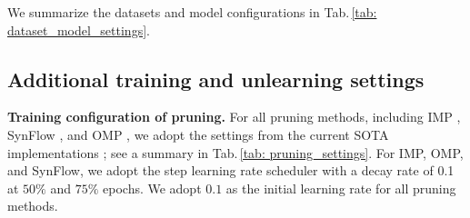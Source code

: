 We summarize the datasets and model configurations in Tab.\,\ref{tab: dataset_model_settings}.  %
\begin{table}[htb]
\centering
\caption{Dataset and model setups. }
\label{tab: dataset_model_settings}
\end{table}


\subsection{Additional training and unlearning settings}
\label{appendix: training and unlearning settings}

\noindent \textbf{Training configuration of pruning.} For all pruning methods, including IMP \cite{frankle2018lottery}, SynFlow \cite{tanaka2020pruning}, and OMP \cite{ma2021sanity}, we adopt the settings from the current SOTA implementations \cite{ma2021sanity}; see a summary in Tab.\,\ref{tab: pruning_settings}. For IMP, OMP, and SynFlow, we adopt the step learning rate scheduler with a decay rate of 0.1 at $50\%$ and $75\%$ epochs. We adopt $0.1$ as the initial learning rate for all pruning methods. 
\begin{table}
    \centering
        \caption{Detailed training details for model pruning.}

\label{tab: pruning_settings}
\end{table}

